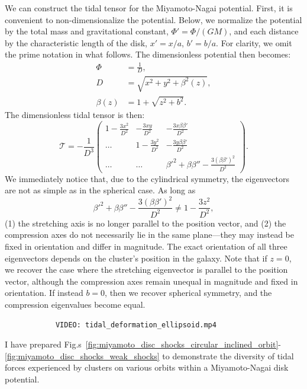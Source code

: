             We can construct the tidal tensor for the Miyamoto-Nagai potential. First, it is convenient to non-dimensionalize the potential. Below, we normalize the potential by the total mass and gravitational constant, $\Phi\prime = \Phi / (GM)$, and each distance by the characteristic length of the disk, $x\prime = x/a$, $b\prime = b/a$. For clarity, we omit the prime notation in what follows. The dimensionless potential then becomes:            
            \begin{eqnarray}
                \Phi   &= \frac{1}{D},\\
                D       &= \sqrt{x^2 + y^2 + \beta^2(z)},\\
                \beta(z)   &= 1 + \sqrt{z^2 + b^2}.
            \end{eqnarray}
            The dimensionless tidal tensor is then: 
            \begin{equation}
                \mathcal{T}=-\frac{1}{D^3}\left(\begin{matrix}
                    1-\frac{3x^2}{D^2} & -\frac{3xy}{D^2} & -\frac{3x\beta \beta'}{D^2} \\
                    \dots & 1-\frac{3y^2}{D^2} & -\frac{3y\beta \beta'}{D^2} \\
                    \dots & \dots & \beta'^2 + \beta \beta'' -\frac{3\left(\beta\beta'\right)^2}{D^2}
                \end{matrix}\right).
            \end{equation}             
            We immediately notice that, due to the cylindrical symmetry, the eigenvectors are not as simple as in the spherical case. As long as 
            \[
            \beta'^2 + \beta \beta'' - \frac{3\left(\beta \beta'\right)^2}{D^2} \neq 1 - \frac{3z^2}{D^2},
            \]
            (1) the stretching axis is no longer parallel to the position vector, and (2) the compression axes do not necessarily lie in the same plane—they may instead be fixed in orientation and differ in magnitude. The exact orientation of all three eigenvectors depends on the cluster's position in the galaxy. Note that if $z = 0$, we recover the case where the stretching eigenvector is parallel to the position vector, although the compression axes remain unequal in magnitude and fixed in orientation. If instead $b = 0$, then we recover spherical symmetry, and the compression eigenvalues become equal.
            \begin{verbatim}
            VIDEO: tidal_deformation_ellipsoid.mp4
            \end{verbatim}
            I have prepared Fig.s~\ref{fig:miyamoto_disc_shocks_circular_inclined_orbit}-\ref{fig:miyamoto_disc_shocks_weak_shocks} to demonstrate the diversity of tidal forces experienced by clusters on various orbits within a Miyamoto-Nagai disk potential. 

